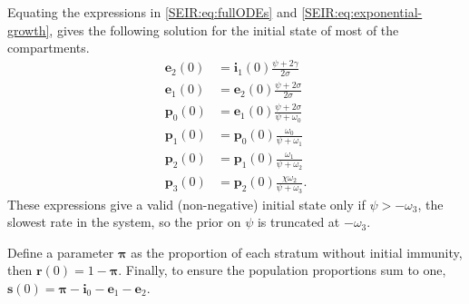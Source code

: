 \documentclass[9pt,twocolumn,twoside]{pnas-new}
\renewcommand{\vec}[1]{\bm{#1}}
\begin{document}
Equating the expressions in \cref{SEIR:eq:fullODEs} and \cref{SEIR:eq:exponential-growth}, gives the following solution for the initial state of most of the compartments.
\begin{align}
    \vec{e}_2(0) &= \vec{i}_1(0) \frac{\psi + 2\gamma}{2\sigma} \\
    \vec{e}_1(0) &= \vec{e}_2(0) \frac{\psi + 2\sigma}{2\sigma} \\
    \vec{p}_0(0) &= \vec{e}_1(0) \frac{\psi + 2\sigma}{\psi + \omega_0} \\
    \vec{p}_1(0) &= \vec{p}_0(0) \frac{\omega_0}{\psi + \omega_1} \\
    \vec{p}_2(0) &= \vec{p}_1(0) \frac{\omega_1}{\psi + \omega_{2}} \\
    \vec{p}_3(0) &= \vec{p}_2(0) \frac{\chi \omega_{2}}{\psi + \omega_{3}}.
\end{align}
These expressions give a valid (non-negative) initial state only if $\psi > -\omega_3$, the slowest rate in the system, so the prior on $\psi$ is truncated at $-\omega_3$.

Define a parameter $\vec{\pi}$ as the proportion of each stratum without initial immunity, then $\vec{r}(0) = 1 - \vec{\pi}$.
Finally, to ensure the population proportions sum to one, $\vec{s}(0) = \vec{\pi} - \vec{i}_0 - \vec{e}_1 - \vec{e}_2$.
\end{document}
